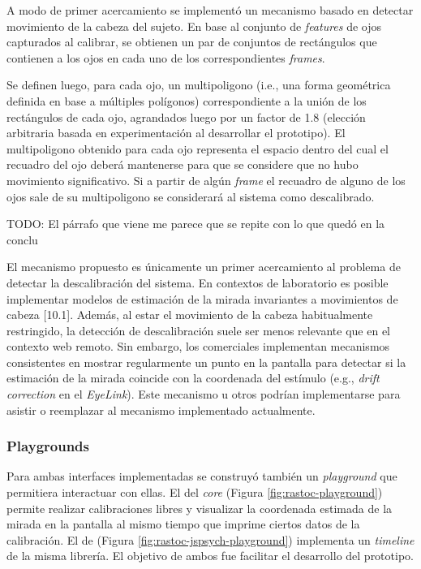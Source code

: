 A modo de primer acercamiento se implementó un mecanismo basado en detectar
movimiento de la cabeza del sujeto.
En base al conjunto de \textit{features} de ojos capturados al calibrar, se
obtienen un par de conjuntos de rectángulos que contienen a los ojos en cada
uno de los correspondientes \textit{frames}.

Se definen luego, para cada ojo, un multipoligono (i.e., una forma geométrica
definida en base a múltiples polígonos) correspondiente a la unión de los
rectángulos de cada ojo, agrandados luego por un factor de 1.8 (elección
arbitraria basada en experimentación al desarrollar el prototipo).
El multipoligono obtenido para cada ojo representa el espacio dentro del cual
el recuadro del ojo deberá mantenerse para que se considere que no hubo
movimiento significativo.
Si a partir de algún \textit{frame} el recuadro de alguno de los ojos sale de
su multipoligono se considerará al sistema como descalibrado.

TODO: El párrafo que viene me parece que se repite con lo que quedó en la
conclu

El mecanismo propuesto es únicamente un primer acercamiento al problema de
detectar la descalibración del sistema.
En contextos de laboratorio es posible implementar modelos de estimación de la
mirada invariantes a movimientos de cabeza [10.1].
Además, al estar el movimiento de la cabeza habitualmente restringido, la
detección de descalibración suele ser menos relevante que en el contexto web
remoto.
Sin embargo, los \eyetrackers comerciales implementan mecanismos consistentes
en mostrar regularmente un punto en la pantalla para detectar si la estimación
de la mirada coincide con la coordenada del estímulo (e.g., \textit{drift
correction} en el \eyetracker \textit{EyeLink}).
Este mecanismo u otros podrían implementarse para asistir o reemplazar al
mecanismo implementado actualmente.

\subsubsection{Playgrounds}

Para ambas interfaces implementadas se construyó también un \textit{playground}
que permitiera interactuar con ellas.
El del \textit{core} (Figura \ref{fig:rastoc-playground}) permite realizar
calibraciones libres y visualizar la coordenada estimada de la mirada en la
pantalla al mismo tiempo que imprime ciertos datos de la calibración.
El de \jspsych (Figura \ref{fig:rastoc-jspsych-playground}) implementa un
\textit{timeline} de la misma librería.
El objetivo de ambos fue facilitar el desarrollo del prototipo.

